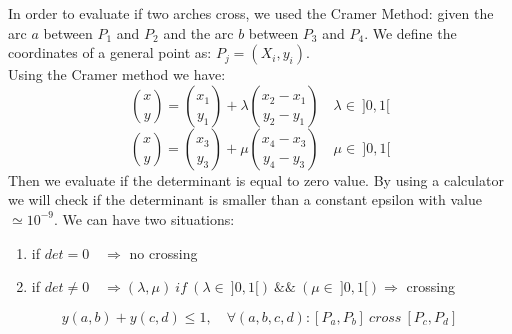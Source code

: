 In order to evaluate if two arches cross, we used the Cramer Method: given the arc $a$ between $P_1$ and $P_2$ and the arc $b$ between $P_3$ and $P_4$. We define the coordinates of a general point as: $P_j = (X_i, y_i)$. \\
Using the Cramer method we have:
\[
{x \choose y} = {x_1 \choose y_1}+ \lambda {x_2 - x_1 \choose y_2 - y_1} \quad \lambda \in \ ]0, 1[
\]   
\[
{x \choose y} = {x_3 \choose y_3}+ \mu {x_4 - x_3 \choose y_4 - y_3} \quad \mu \in \ ]0, 1[
\]    
Then we evaluate if the determinant is equal to zero value. By using a calculator we will check if the determinant is smaller than a constant epsilon with value $\simeq 10^{-9}$. We can have two situations:
\begin{enumerate}
\item if $det=0 \quad \Rightarrow$ no crossing 
\item if $det \neq 0 \quad \Rightarrow (\lambda, \mu) \ if \ (\lambda \in \ ]0, 1[) \ \&\& \ (\mu \in \ ]0, 1[) \Rightarrow $ crossing
\end{enumerate}                                                   

\[
y(a,b)+ y(c,d) \leq 1, \quad \forall (a,b,c,d): [P_a, P_b] \ cross \ [P_c, P_d]
\]

